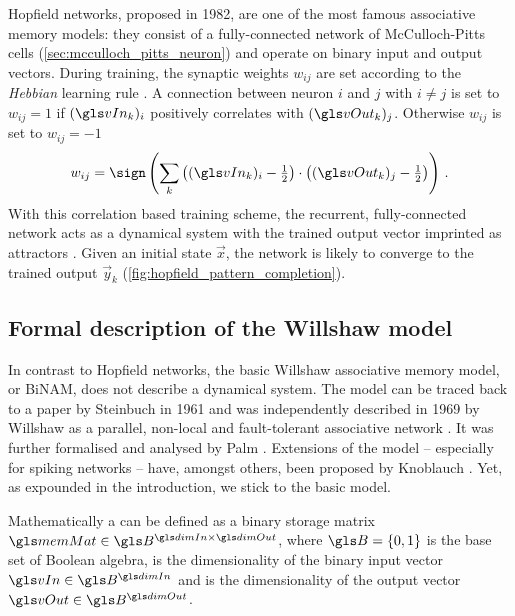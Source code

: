 Hopfield networks, proposed in 1982, are one of the most famous associative memory models: they consist of a fully-connected network of McCulloch-Pitts cells (\cref{sec:mcculloch_pitts_neuron}) and operate on binary input and output vectors. During training, the synaptic weights $w_{ij}$ are set according to the \emph{Hebbian} learning rule \cite{hebb2005organization}. A connection between neuron $i$ and $j$ with $i \neq j$ is set to $w_{ij} = 1$ if $(\vIn_k)_i$ positively correlates with $(\vOut_k)_j$. Otherwise $w_{ij}$ is set to $w_{ij} = -1$
\begin{align}
	w_{ij} = \sign\left(\sum_{k} \big((\vIn_k)_i- \tfrac{1}2\big) \cdot \big( (\vOut_k)_j - \tfrac{1}2\big) \right) \,.
\end{align}
With this correlation based training scheme, the recurrent, fully-con\-nect\-ed network acts as a dynamical system with the trained output vector imprinted as attractors \cite{hopfield1982neural, hopfield2007hopfield}. Given an initial state $\vec x$, the network is likely to converge to the trained output $\vec y_k$ (\cref{fig:hopfield_pattern_completion}).

\subsection{Formal description of the Willshaw model}
\label{sec:binam_formal}

In contrast to Hopfield networks, the basic Willshaw associative memory model, or \acrfull{BiNAM}, does not describe a dynamical system. The model can be traced back to a paper by Steinbuch in 1961 \cite{steinbuch1961lernmatrix} and was independently described in 1969 by Willshaw \etal as a parallel, non-local and fault-tolerant associative network \cite{BiNAM1969}. It was further formalised and analysed by Palm \cite{palm1980associative}. Extensions of the model -- especially for spiking networks -- have, amongst others, been proposed by Knoblauch \cite{knoblauch2003synchronization, knoblauch2014structural}. Yet, as expounded in the introduction, we stick to the basic model.

Mathematically a \BiNAM can be defined as a binary storage matrix $\memMat \in \B^{\dimIn \times \dimOut}$, where $\B = \{0, 1\}$ is the base set of Boolean algebra, \dimIn is the dimensionality of the binary input vector $\vIn \in \B^{\dimIn}$ and \dimOut is the dimensionality of the output vector $\vOut \in \B^{\dimOut}$.

